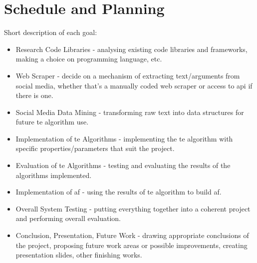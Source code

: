 \section{Schedule and Planning}
    
    
    Short description of each goal:
    \begin{itemize}
        \item Research Code Libraries - analysing existing code libraries and frameworks, making a choice on programming language, etc.
        \item Web Scraper - decide on a mechanism of extracting text/arguments from social media, whether that's a manually coded web scraper or access to \gls{api} if there is one.
        \item Social Media Data Mining - transforming raw text into data structures for future \gls{te} algorithm use.
        \item Implementation of \gls{te} Algorithms - implementing the \gls{te} algorithm with specific properties/parameters that suit the project.
        \item Evaluation of \gls{te} Algorithms - testing and evaluating the results of the algorithms implemented.
        \item Implementation of \gls{af} - using the results of \gls{te} algorithm to build \gls{af}.
        \item Overall System Testing - putting everything together into a coherent project and performing overall evaluation.
        \item Conclusion, Presentation, Future Work - drawing appropriate conclusions of the project, proposing future work areas or possible improvements, creating presentation slides, other finishing works.
    \end{itemize}
